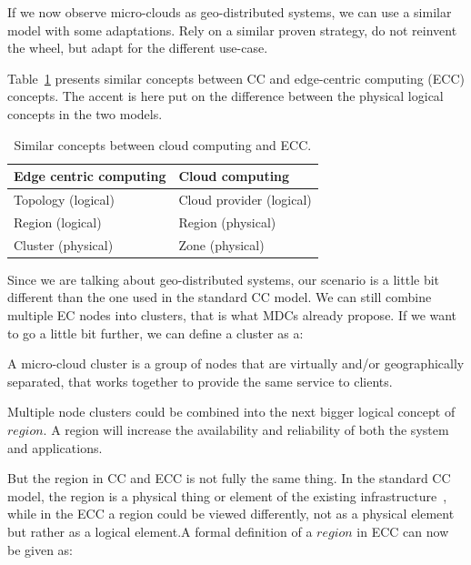 If we now observe micro-clouds as geo-distributed systems, we can use a similar model with some adaptations. Rely on a similar proven strategy, do not reinvent the wheel, but adapt for the different use-case.

Table~\ref{tab:table5} presents similar concepts between CC and edge-centric computing (ECC) concepts. The accent is here put on the difference between the physical logical concepts in the two models.

\begin{table}[h!]
	\begin{center}
		\begin{tabular}{l|l}
			\textbf{Edge centric computing} & \textbf{Cloud computing}\\
			\hline
			Topology (logical) & Cloud provider (logical)\\
			Region (logical) & Region (physical)\\
			Cluster (physical) & Zone (physical)\\
		\end{tabular}
	\end{center}
	\vspace{-0.5cm}
	\caption{Similar concepts between cloud computing and ECC.}
	\label{tab:table5}
\end{table}

\noindent
Since we are talking about geo-distributed systems, our scenario is a little bit different than the one used in the standard CC model. We can still combine multiple EC nodes into clusters, that is what MDCs already propose. If we want to go a little bit further, we can define a cluster as a:

\begin{definition}
	A micro-cloud cluster is a group of nodes that are virtually and/or geographically separated, that works together to provide the same service to clients.
\end{definition}

\noindent
Multiple node clusters could be combined into the next bigger logical concept of $region$. A region will increase the availability and reliability of both the system and applications. 

But the region in CC and ECC is not fully the same thing. In the standard CC model, the region is a physical thing or element of the existing infrastructure~\cite{SouzaMFAK19}, while in the ECC a region could be viewed differently, not as a physical element but rather as a logical element.A formal definition of a $region$ in ECC can now be given as:

